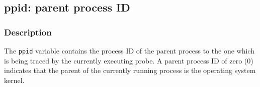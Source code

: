 \clearpage
{}
{}
\label{vars:ppid}
\subsection*{ppid: parent process ID}

\subsubsection*{Description}

The \verb|ppid| variable contains the process ID of the parent process
to the one which is being traced by the currently executing probe.  A
parent process ID of zero (0) indicates that the parent of the
currently running process is the operating system kernel.

